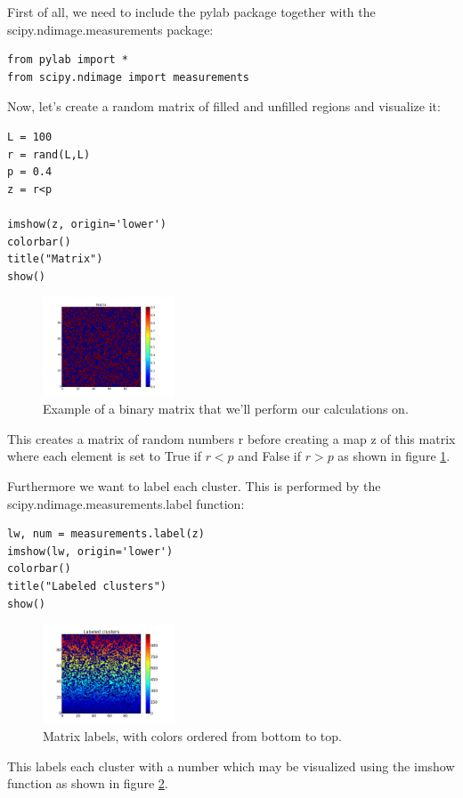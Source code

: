 \documentclass[a4paper,reprint,floatfix,amsmath,amssymb,aps,pra]{revtex4-1}
\begin{document}
First of all, we need to include the pylab package together with the scipy.ndimage.measurements package:
%
\begin{lstlisting}
from pylab import *
from scipy.ndimage import measurements
\end{lstlisting}
%
Now, let's create a random matrix of filled and unfilled regions and visualize it:
%
\begin{lstlisting}
L = 100
r = rand(L,L)
p = 0.4
z = r<p

imshow(z, origin='lower')
colorbar()
title("Matrix")
show()
\end{lstlisting}
%
\begin{figure}
  \centering
  \includegraphics[width=0.35\textwidth]{./images/matrix.png}
  \caption{Example of a binary matrix that we'll perform our calculations on.}
  \label{fig:intro-matrix}
\end{figure}
%
This creates a matrix of random numbers r before creating a map z of this matrix where each element is set to True if $r < p$ and False if $r > p$ as shown in figure \ref{fig:intro-matrix}.

Furthermore we want to label each cluster. This is performed by the scipy.ndimage.measurements.label function:
%
\begin{lstlisting}
lw, num = measurements.label(z)
imshow(lw, origin='lower')
colorbar()
title("Labeled clusters")
show()
\end{lstlisting}
%
\begin{figure}[b]
  \centering
  \includegraphics[width=0.35\textwidth]{./images/labeled-matrix-ordered.png}
  \caption{Matrix labels, with colors ordered from bottom to top.}
  \label{fig:intro-labels}
\end{figure}
%
This labels each cluster with a number which may be visualized using the imshow function as shown in figure \ref{fig:intro-labels}.
\end{document}
